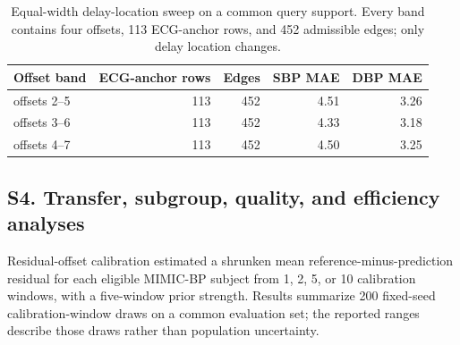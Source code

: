 \documentclass[11pt]{article}
\begin{document}
\begin{table}[H]
\centering
\caption{Delay-band sensitivity under the complete five-fold subject-grouped protocol. The literature-guided 120--450 ms band was held fixed throughout model comparison.}
\label{tab:delay_sensitivity}
\small
{}
\end{table}

\begin{table}[H]
\centering
\caption{Equal-width delay-location sweep on a common query support. Every band contains four offsets, 113 ECG-anchor rows, and 452 admissible edges; only delay location changes.}
\label{tab:equal_width_offsets}
\small
\begin{tabular}{lrrrr}
\toprule
Offset band & ECG-anchor rows & Edges & SBP MAE & DBP MAE \\
\midrule
offsets 2--5 & 113 & 452 & 4.51 & 3.26 \\
offsets 3--6 & 113 & 452 & 4.33 & 3.18 \\
offsets 4--7 & 113 & 452 & 4.50 & 3.25 \\
\bottomrule
\end{tabular}
\end{table}



\subsection*{S4. Transfer, subgroup, quality, and efficiency analyses}

Residual-offset calibration estimated a shrunken mean reference-minus-prediction residual for each eligible MIMIC-BP subject from 1, 2, 5, or 10 calibration windows, with a five-window prior strength. Results summarize 200 fixed-seed calibration-window draws on a common evaluation set; the reported ranges describe those draws rather than population uncertainty.
\end{document}
